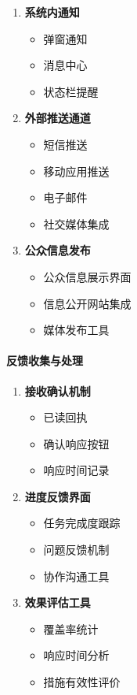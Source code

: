\begin{enumerate}
\def\labelenumi{\arabic{enumi}.}
\tightlist
\item
  \textbf{系统内通知}

  \begin{itemize}
  \tightlist
  \item
    弹窗通知
  \item
    消息中心
  \item
    状态栏提醒
  \end{itemize}
\item
  \textbf{外部推送通道}

  \begin{itemize}
  \tightlist
  \item
    短信推送
  \item
    移动应用推送
  \item
    电子邮件
  \item
    社交媒体集成
  \end{itemize}
\item
  \textbf{公众信息发布}

  \begin{itemize}
  \tightlist
  \item
    公众信息展示界面
  \item
    信息公开网站集成
  \item
    媒体发布工具
  \end{itemize}
\end{enumerate}

\paragraph{反馈收集与处理}\label{ux53cdux9988ux6536ux96c6ux4e0eux5904ux7406}

\begin{enumerate}
\def\labelenumi{\arabic{enumi}.}
\tightlist
\item
  \textbf{接收确认机制}

  \begin{itemize}
  \tightlist
  \item
    已读回执
  \item
    确认响应按钮
  \item
    响应时间记录
  \end{itemize}
\item
  \textbf{进度反馈界面}

  \begin{itemize}
  \tightlist
  \item
    任务完成度跟踪
  \item
    问题反馈机制
  \item
    协作沟通工具
  \end{itemize}
\item
  \textbf{效果评估工具}

  \begin{itemize}
  \tightlist
  \item
    覆盖率统计
  \item
    响应时间分析
  \item
    措施有效性评价
  \end{itemize}
\end{enumerate}


